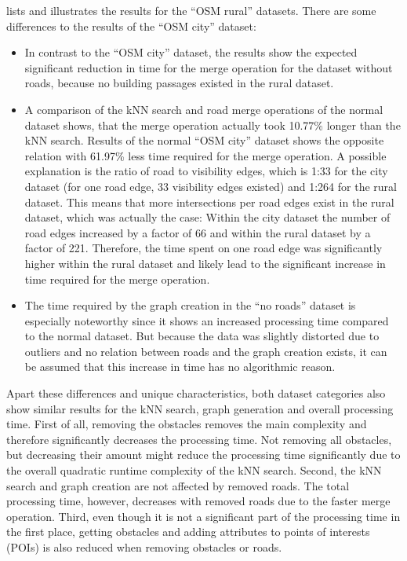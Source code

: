 			\noindent
			 lists and illustrates the results for the \enquote{OSM rural} datasets.
			There are some differences to the results of the \enquote{OSM city} dataset:
			\begin{itemize}
				\item In contrast to the \enquote{OSM city} dataset, the results show the expected significant reduction in time for the merge operation for the dataset without roads, because no building passages existed in the rural dataset.
				\item A comparison of the kNN search and road merge operations of the normal dataset shows, that the merge operation actually took 10.77\% longer than the kNN search.
				Results of the normal \enquote{OSM city} dataset shows the opposite relation with 61.97\% less time required for the merge operation.
				A possible explanation is the ratio of road to visibility edges, which is 1:33 for the city dataset (for one road edge, 33 visibility edges existed) and 1:264 for the rural dataset.
				This means that more intersections per road edges exist in the rural dataset, which was actually the case:
				Within the city dataset the number of road edges increased by a factor of 66 and within the rural dataset by a factor of 221.
				Therefore, the time spent on one road edge was significantly higher within the rural dataset and likely lead to the significant increase in time required for the merge operation.
				\item The time required by the graph creation in the \enquote{no roads} dataset is especially noteworthy since it shows an increased processing time compared to the normal dataset.
				But because the data was slightly distorted due to outliers and no relation between roads and the graph creation exists, it can be assumed that this increase in time has no algorithmic reason.
			\end{itemize}
			Apart these differences and unique characteristics, both dataset categories also show similar results for the kNN search, graph generation and overall processing time.
			First of all, removing the obstacles removes the main complexity and therefore significantly decreases the processing time.
			Not removing all obstacles, but decreasing their amount might reduce the processing time significantly due to the overall quadratic runtime complexity of the kNN search.
			Second, the kNN search and graph creation are not affected by removed roads.
			The total processing time, however, decreases with removed roads due to the faster merge operation.
			Third, even though it is not a significant part of the processing time in the first place, getting obstacles and adding attributes to points of interests (POIs) is also reduced when removing obstacles or roads.
	
